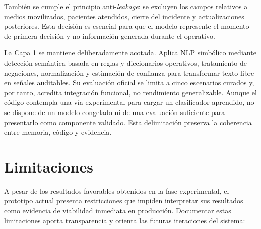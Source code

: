 También se cumple el principio anti-\textit{leakage}: se excluyen los campos relativos
a medios movilizados, pacientes atendidos, cierre del incidente y actualizaciones
posteriores. Esta decisión es esencial para que el modelo represente el momento de
primera decisión y no información generada durante el operativo.

La Capa 1 se mantiene deliberadamente acotada. Aplica NLP simbólico mediante detección
semántica basada en reglas y diccionarios operativos, tratamiento de negaciones,
normalización y estimación de confianza para transformar texto libre en señales
auditables. Su evaluación oficial se limita a cinco escenarios curados y, por
tanto, acredita integración funcional, no rendimiento generalizable. Aunque el código
contempla una vía experimental para cargar un clasificador aprendido, no se dispone de
un modelo congelado ni de una evaluación suficiente para presentarlo como componente
validado. Esta delimitación preserva la coherencia entre memoria, código y evidencia.

\section{Limitaciones}

A pesar de los resultados favorables obtenidos en la fase experimental, el prototipo actual presenta restricciones que impiden interpretar sus resultados como evidencia de viabilidad inmediata en producción. Documentar estas limitaciones aporta transparencia y orienta las futuras iteraciones del sistema:


